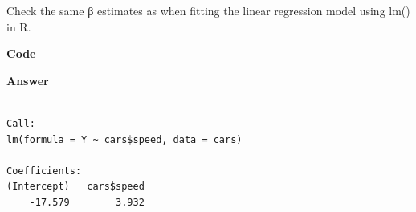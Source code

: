 \documentclass[
  letterpaper,
]{book}
\newenvironment{Shaded}{\begin{snugshade}}{\end{snugshade}}
\newcommand{\AttributeTok}[1]{\textcolor[rgb]{0.40,0.45,0.13}{#1}}
\newcommand{\DecValTok}[1]{\textcolor[rgb]{0.68,0.00,0.00}{#1}}
\newcommand{\DocumentationTok}[1]{\textcolor[rgb]{0.37,0.37,0.37}{\textit{#1}}}
\newcommand{\FunctionTok}[1]{\textcolor[rgb]{0.28,0.35,0.67}{#1}}
\newcommand{\NormalTok}[1]{\textcolor[rgb]{0.00,0.23,0.31}{#1}}
\newcommand{\OtherTok}[1]{\textcolor[rgb]{0.00,0.23,0.31}{#1}}
\newcommand{\SpecialCharTok}[1]{\textcolor[rgb]{0.37,0.37,0.37}{#1}}
\begin{document}
Check the same β estimates as when fitting the linear regression model
using lm() in R.

\textbf{Code}

\begin{Shaded}
\end{Shaded}

\textbf{Answer}

\begin{verbatim}

Call:
lm(formula = Y ~ cars$speed, data = cars)

Coefficients:
(Intercept)   cars$speed  
    -17.579        3.932  
\end{verbatim}


\backmatter
\end{document}
